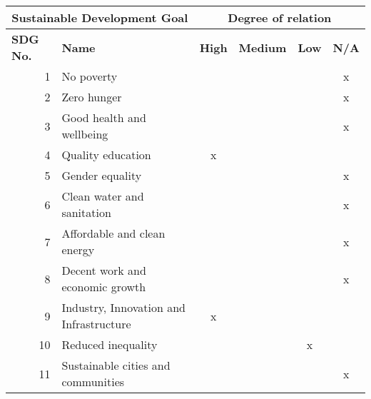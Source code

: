 \begin{table}
    \small
    \centering
    \renewcommand{\arraystretch}{1.5}
    
    \begin{tabular}{|rp{7.15cm}|cccc|}
        \hline
        \multicolumn{2}{|c|}{\textbf{Sustainable Development Goal}} & \multicolumn{4}{c|}{\textbf{Degree of relation}} \\ \hline
        \multicolumn{1}{|l|}{\textbf{SDG No.}} & \textbf{Name} & \multicolumn{1}{c|}{\textbf{High}} & \multicolumn{1}{c|}{\textbf{Medium}} & \multicolumn{1}{c|}{\textbf{Low}} & \multicolumn{1}{c|}{\textbf{N/A}} \\ \hline\hline
        \multicolumn{1}{|r|}{1} & No poverty & \multicolumn{1}{c|}{} & \multicolumn{1}{c|}{} & \multicolumn{1}{c|}{} & x \\ \hline
        \multicolumn{1}{|r|}{2} & Zero hunger & \multicolumn{1}{c|}{} & \multicolumn{1}{c|}{} & \multicolumn{1}{c|}{} & x \\ \hline
        \multicolumn{1}{|r|}{3} & Good health and wellbeing & \multicolumn{1}{c|}{} & \multicolumn{1}{c|}{} & \multicolumn{1}{c|}{} & x \\ \hline
        \multicolumn{1}{|r|}{4} & Quality education & \multicolumn{1}{c|}{x} & \multicolumn{1}{c|}{} & \multicolumn{1}{c|}{} &  \\ \hline
        \multicolumn{1}{|r|}{5} & Gender equality & \multicolumn{1}{c|}{} & \multicolumn{1}{c|}{} & \multicolumn{1}{c|}{} & x \\ \hline
        \multicolumn{1}{|r|}{6} & Clean water and sanitation & \multicolumn{1}{c|}{} & \multicolumn{1}{c|}{} & \multicolumn{1}{c|}{} & x \\ \hline
        \multicolumn{1}{|r|}{7} & Affordable and clean energy & \multicolumn{1}{c|}{} & \multicolumn{1}{c|}{} & \multicolumn{1}{c|}{} & x \\ \hline
        \multicolumn{1}{|r|}{8} & Decent work and economic growth & \multicolumn{1}{c|}{} & \multicolumn{1}{c|}{} & \multicolumn{1}{c|}{} & x \\ \hline
        \multicolumn{1}{|r|}{9} & Industry, Innovation and Infrastructure & \multicolumn{1}{c|}{x} & \multicolumn{1}{c|}{} & \multicolumn{1}{c|}{} &  \\ \hline
        \multicolumn{1}{|r|}{10} & Reduced inequality & \multicolumn{1}{c|}{} & \multicolumn{1}{c|}{} & \multicolumn{1}{c|}{x} &  \\ \hline
        \multicolumn{1}{|r|}{11} & Sustainable cities and communities & \multicolumn{1}{c|}{} & \multicolumn{1}{c|}{} & \multicolumn{1}{c|}{} & x \\ \hline

\end{tabular}
\end{table}
